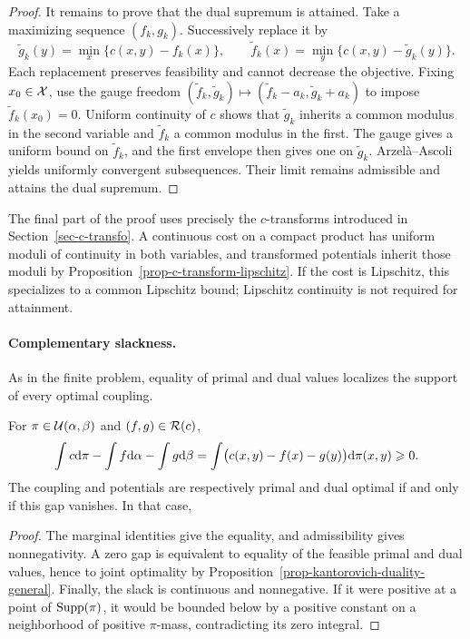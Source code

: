 \begin{proof}
	It remains to prove that the dual supremum is attained. Take a maximizing sequence $(f_k,g_k)$. Successively replace it by
	\[
		\widetilde g_k(y)=\min_x\{c(x,y)-f_k(x)\},
		\qquad
		\widetilde f_k(x)=\min_y\{c(x,y)-\widetilde g_k(y)\}.
	\]
	Each replacement preserves feasibility and cannot decrease the objective. Fixing $x_0\in\mathcal{X}$, use the gauge freedom
	$(\widetilde f_k,\widetilde g_k)\mapsto
	(\widetilde f_k-a_k,\widetilde g_k+a_k)$
	to impose $\widetilde f_k(x_0)=0$. Uniform continuity of $c$ shows that $\widetilde g_k$ inherits a common modulus in the second variable and $\widetilde f_k$ a common modulus in the first. The gauge gives a uniform bound on $\widetilde f_k$, and the first envelope then gives one on $\widetilde g_k$. Arzel\`a--Ascoli yields uniformly convergent subsequences. Their limit remains admissible and attains the dual supremum.
\end{proof}

\begin{rem}\label{rem-kantorovich-dual-attainment}
	The final part of the proof uses precisely the $c$-transforms introduced in Section~\ref{sec-c-transfo}. A continuous cost on a compact product has uniform moduli of continuity in both variables, and transformed potentials inherit those moduli by Proposition~\ref{prop-c-transform-lipschitz}. If the cost is Lipschitz, this specializes to a common Lipschitz bound; Lipschitz continuity is not required for attainment.
\end{rem}

\paragraph{Complementary slackness.}
As in the finite problem, equality of primal and dual values localizes the support of every optimal coupling.

\begin{prop}\label{prop-continuous-complementary-slackness}
	For $\pi\in\mathcal{U}(\alpha,\beta)$ and $(f,g)\in\mathcal{R}(c)$,
	\[
		\int c\mathrm{d}\pi-\int f\mathrm{d}\alpha-\int g\mathrm{d}\beta
		=
		\int\bigl(c(x,y)-f(x)-g(y)\bigr)\mathrm{d}\pi(x,y)
		\geqslant0.
	\]
	The coupling and potentials are respectively primal and dual optimal if and only if this gap vanishes. In that case,
\end{prop}
\begin{proof}
	The marginal identities give the equality, and admissibility gives nonnegativity. A zero gap is equivalent to equality of the feasible primal and dual values, hence to joint optimality by Proposition~\ref{prop-kantorovich-duality-general}. Finally, the slack is continuous and nonnegative. If it were positive at a point of $\operatorname{Supp}(\pi)$, it would be bounded below by a positive constant on a neighborhood of positive $\pi$-mass, contradicting its zero integral.
\end{proof}

